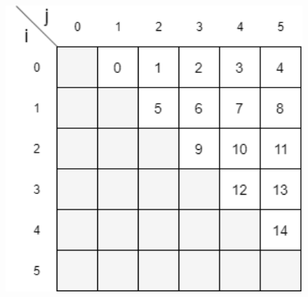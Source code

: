\begin{figure}[h!] 
\begin{center} 
  \includegraphics[width=14cm]{Images/indices_matrix}\\ 
  \caption{} 
\end{center} 
\end{figure}






